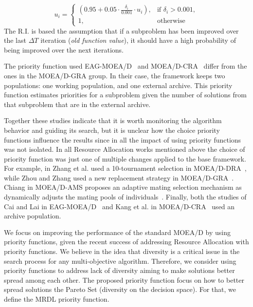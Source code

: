\[
u_i= 
\begin{cases}

(0.95 + 0.05 \cdot \frac{\delta_i}{0.001} \cdot u_i), & \text{if } \delta_i > 0.001,
\\
1,              & \text{otherwise}

\end{cases}\label{priority2}
\]
The R.I. is based the assumption that if a subproblem has been improved over the last $\Delta T$ iteration (\textit{old function value}), it should have a high probability of being improved over the next iterations. 

The priority function used EAG-MOEA/D~\cite{cai2015external} and MOEA/D-CRA~\cite{kang2018collaborative} differ from the ones in the MOEA/D-GRA group. In their case, the framework keeps two populations: one working population, and one external archive. This priority function estimates priorities for a subproblem given the number of solutions from that subproblem that are in the external archive.

Together these studies indicate that it is worth monitoring the algorithm behavior and guiding its search, but it is unclear how the choice priority functions influence the results since in all the impact of using priority functions was not isolated. In all Resource Allocation works mentioned above the choice of priority function was just one of multiple changes applied to the base framework. For example, in Zhang et al. used a 10-tournament selection in MOEA/D-DRA~\cite{zhang2009performance}, while Zhou and Zhang used a new replacement strategy in MOEA/D-GRA~\cite{zhou2016all}. Chiang in MOEA/D-AMS proposes an adaptive mating selection mechanism as dynamically adjusts the mating pools of individuals~\cite{chiang2011moea}. Finally, both the studies of Cai and Lai in  EAG-MOEA/D~\cite{cai2015external} and Kang et al. in MOEA/D-CRA~\cite{kang2018collaborative} used an archive population.

We focus on improving the performance of the standard MOEA/D by using priority functions, given the recent success of addressing Resource Allocation with priority functions. We believe in the idea that diversity is a critical issue in the search process for any multi-objective algorithm. Therefore, we consider using priority functions to address lack of diversity aiming to make solutions better spread among each other. The proposed priority function focus on how to better spread solutions the Pareto Set (diversity on the decision space). For that, we define the MRDL priority function.




